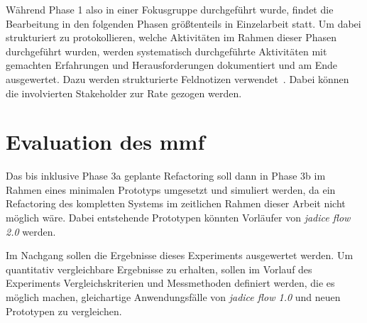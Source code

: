 Während Phase 1 also in einer Fokusgruppe durchgeführt wurde, findet die Bearbeitung in den folgenden Phasen größtenteils in Einzelarbeit statt.
Um dabei strukturiert zu protokollieren, welche Aktivitäten im Rahmen dieser Phasen durchgeführt wurden, werden systematisch durchgeführte Aktivitäten mit gemachten Erfahrungen und Herausforderungen dokumentiert und am Ende ausgewertet.
Dazu werden strukturierte Feldnotizen verwendet~\cite{seaman2008qualitative}.
Dabei können die involvierten Stakeholder zur Rate gezogen werden.


\section{Evaluation des \gls{mmf}}

Das bis inklusive Phase 3a geplante Refactoring soll dann in Phase 3b im Rahmen eines minimalen Prototyps umgesetzt und simuliert werden, da ein Refactoring des kompletten Systems im zeitlichen Rahmen dieser Arbeit nicht möglich wäre.
Dabei entstehende Prototypen könnten Vorläufer von \emph{jadice flow 2.0} werden.

Im Nachgang sollen die Ergebnisse dieses Experiments ausgewertet werden. Um quantitativ vergleichbare Ergebnisse zu erhalten, sollen im Vorlauf des Experiments Vergleichskriterien und Messmethoden definiert werden, die es möglich machen, gleichartige Anwendungsfälle von \emph{jadice flow 1.0} und neuen Prototypen zu vergleichen.
